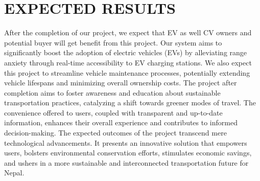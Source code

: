 \newpage

\section{EXPECTED RESULTS}
After the completion of our project, we expect that EV as well CV owners and 
potential buyer will get benefit from this project. Our system aims to significantly boost the adoption of electric vehicles (EVs) by alleviating range anxiety through real-time accessibility to EV charging stations. We also expect this project to streamline vehicle maintenance processes, potentially extending vehicle lifespans and minimizing overall ownership costs. The project after completion aims to foster awareness and education about sustainable transportation practices, catalyzing a shift towards greener modes of travel. The convenience offered to users, coupled with transparent and up-to-date information, enhances their overall experience and contributes to informed decision-making. The expected outcomes of the project transcend mere technological advancements. It presents an innovative solution that empowers users, bolsters environmental conservation efforts, stimulates economic savings, and ushers in a more sustainable and interconnected transportation future for Nepal.